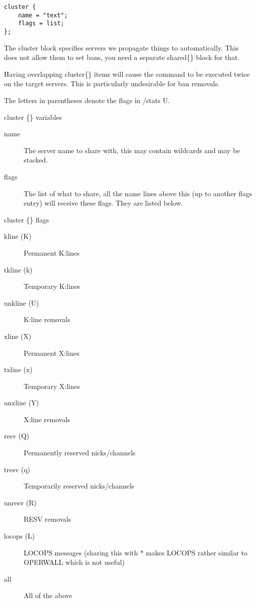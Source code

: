 \begin{verbatim}
cluster {
	name = "text";
	flags = list;
};\end{verbatim}

	The cluster block specifies servers we propagate things to
	automatically.
	This does not allow them to set bans, you need a separate shared\{\}
	block for that.

	Having overlapping cluster\{\} items will cause the command to
	be executed twice on the target servers. This is particularly
	undesirable for ban removals.

	The letters in parentheses denote the flags in /stats U.


{\sc cluster \{\} variables}
\nopagebreak

\noindent
\begin{description}
\item[{name}]
	The server name to share with, this may contain wildcards
	and may be stacked.

\item[{flags}]
	The list of what to share, all the name lines above this
	(up to another flags entry) will receive these flags.
	They are listed below.
\end{description}


{\sc cluster \{\} flags}
\nopagebreak

\noindent
\begin{description}
\item[{kline (K)}]
	Permanent K:lines

\item[{tkline (k)}]
	Temporary K:lines

\item[{unkline (U)}]
	K:line removals

\item[{xline (X)}]
	Permanent X:lines

\item[{txline (x)}]
	Temporary X:lines

\item[{unxline (Y)}]
	X:line removals

\item[{resv (Q)}]
	Permanently reserved nicks/channels

\item[{tresv (q)}]
	Temporarily reserved nicks/channels
\item[{unresv (R)}]
	RESV removals

\item[{locops (L)}]
	LOCOPS messages (sharing this with * makes LOCOPS rather
	similar to OPERWALL which is not useful)

\item[{all}] All of the above
\end{description}


